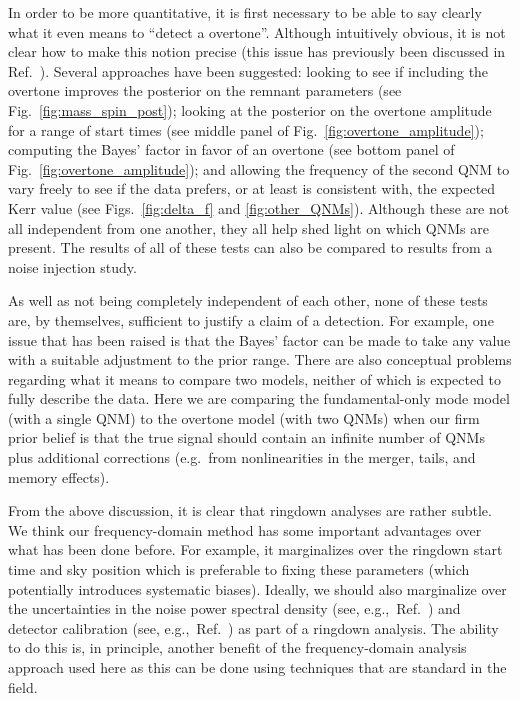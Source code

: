 In order to be more quantitative, it is first necessary to be able to say clearly what it even means to ``detect a overtone''. 
Although intuitively obvious, it is not clear how to make this notion precise (this issue has previously been discussed in Ref.~\cite{Isi:2022mhy}). 
Several approaches have been suggested: looking to see if including the overtone improves the posterior on the remnant parameters (see Fig.~\ref{fig:mass_spin_post}); looking at the posterior on the overtone amplitude for a range of start times (see middle panel of Fig.~\ref{fig:overtone_amplitude}); computing the Bayes' factor in favor of an overtone (see bottom panel of Fig.~\ref{fig:overtone_amplitude}); and allowing the frequency of the second QNM to vary freely to see if the data prefers, or at least is consistent with, the expected Kerr value (see Figs.~\ref{fig:delta_f} and \ref{fig:other_QNMs}).
Although these are not all independent from one another, they all help shed light on which QNMs are present. 
The results of all of these tests can also be compared to results from a noise injection study.

As well as not being completely independent of each other, none of these tests are, by themselves, sufficient to justify a claim of a detection.
For example, one issue that has been raised is that the Bayes' factor can be made to take any value with a suitable adjustment to the prior range.
There are also conceptual problems regarding what it means to compare two models, neither of which is expected to fully describe the data. Here we are comparing the fundamental-only mode model (with a single QNM) to the overtone model (with two QNMs) when our firm prior belief is that the true signal should contain an infinite number of QNMs plus additional corrections (e.g.\ from nonlinearities in the merger, tails, and memory effects).

From the above discussion, it is clear that ringdown analyses are rather subtle. 
We think our frequency-domain method has some important advantages over what has been done before. 
For example, it marginalizes over the ringdown start time and sky position which is preferable to fixing these parameters (which potentially introduces systematic biases). 
Ideally, we should also marginalize over the uncertainties in the noise power spectral density (see, e.g.,\ Ref.~\cite{Cornish:2020dwh}) and detector calibration (see, e.g.,\ Ref.~\cite{2017PhRvD..96j2001C}) as part of a ringdown analysis. 
The ability to do this is, in principle, another benefit of the frequency-domain analysis approach used here as this can be done using techniques that are standard in the field.

